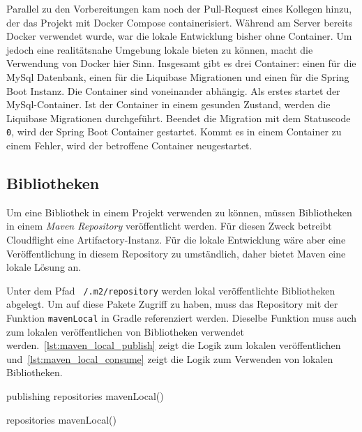 Parallel zu den Vorbereitungen kam noch der Pull-Request eines Kollegen hinzu, der das Projekt mit Docker Compose containerisiert. Während am Server bereits Docker verwendet wurde, war die lokale Entwicklung bisher ohne Container. Um jedoch eine realitätsnahe Umgebung lokale bieten zu können, macht die Verwendung von Docker hier Sinn. Insgesamt gibt es drei Container: einen für die MySql Datenbank, einen für die Liquibase Migrationen und einen für die Spring Boot Instanz. Die Container sind voneinander abhängig. Als erstes startet der MySql-Container. Ist der Container in einem gesunden Zustand, werden die Liquibase Migrationen durchgeführt. Beendet die Migration mit dem Statuscode \texttt{0}, wird der Spring Boot Container gestartet. Kommt es in einem Container zu einem Fehler, wird der betroffene Container neugestartet.

\subsection{Bibliotheken}

Um eine Bibliothek in einem Projekt verwenden zu können, müssen Bibliotheken in einem \textit{Maven Repository} veröffentlicht werden. Für diesen Zweck betreibt Cloudflight eine Artifactory-Instanz. Für die lokale Entwicklung wäre aber eine Veröffentlichung in diesem Repository zu umständlich, daher bietet Maven eine lokale Lösung an.

Unter dem Pfad \texttt{~/.m2/repository} werden lokal veröffentlichte Bibliotheken abgelegt. Um auf diese Pakete Zugriff zu haben, muss das Repository mit der Funktion \texttt{mavenLocal} in Gradle referenziert werden. Dieselbe Funktion muss auch zum lokalen veröffentlichen von Bibliotheken verwendet werden.~\autoref{lst:maven_local_publish} zeigt die Logik zum lokalen veröffentlichen und~\autoref{lst:maven_local_consume} zeigt die Logik zum Verwenden von lokalen Bibliotheken.

\begin{Groovy}[numbers=none, caption={Code zum lokalen veröffentlichen einer Bibliothek}, label={lst:maven_local_publish}]
publishing {
    repositories {
        mavenLocal()
    }
}
\end{Groovy}

\begin{Groovy}[numbers=none, caption={Code zum inkludieren des lokalen Repository.},label={lst:maven_local_consume}]
repositories {
    mavenLocal()
}
\end{Groovy}

